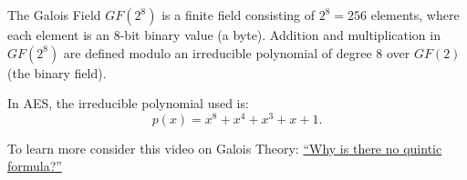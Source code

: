 \begin{Def}

    \label{def:galois_field}
    The Galois Field $GF(2^8)$ is a finite field consisting of $2^8 = 256$ elements, where each element is an 8-bit binary value (a byte).
    Addition and multiplication in $GF(2^8)$ are defined modulo an irreducible polynomial of degree 8 over $GF(2)$ (the binary field).
    
    \noindent
    In AES, the irreducible polynomial used is:
    \[
    p(x) = x^8 + x^4 + x^3 + x + 1.
    \]
\end{Def}

\vspace{-1em}
\begin{Tip}
    To learn more consider this video on Galois Theory: \href{https://www.youtube.com/watch?v=1EWUsef0iFs}{``Why is there no quintic formula?''}
\end{Tip}


